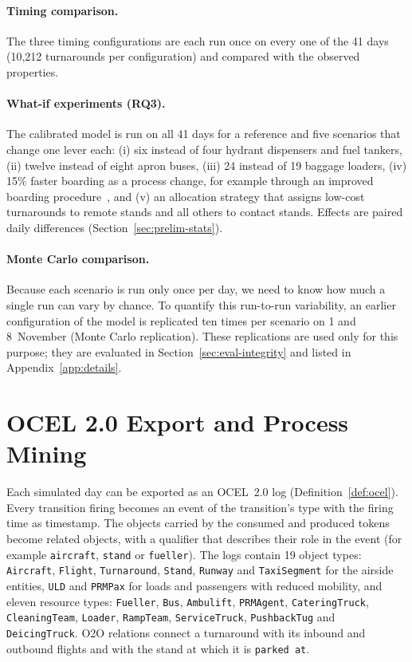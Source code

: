 \paragraph{Timing comparison.}
The three timing configurations are each run once on every one of the 41 days (10,212 turnarounds per configuration) and compared with the observed properties.

\paragraph{What-if experiments (RQ3).}
The calibrated model is run on all 41 days for a reference and five scenarios that change one lever each: (i) six instead of four hydrant dispensers and fuel tankers, (ii) twelve instead of eight apron buses, (iii) 24 instead of 19 baggage loaders, (iv) 15\% faster boarding as a process change, for example through an improved boarding procedure~\cite{schultz2018boarding}, and (v) an allocation strategy that assigns low-cost turnarounds to remote stands and all others to contact stands. Effects are paired daily differences (Section~\ref{sec:prelim-stats}).

\paragraph{Monte Carlo comparison.}
Because each scenario is run only once per day, we need to know how much a single run can vary by chance. To quantify this run-to-run variability, an earlier configuration of the model is replicated ten times per scenario on 1 and 8~November (Monte Carlo replication). These replications are used only for this purpose; they are evaluated in Section~\ref{sec:eval-integrity} and listed in Appendix~\ref{app:details}.

\section{OCEL 2.0 Export and Process Mining}
\label{sec:method-ocel}

Each simulated day can be exported as an OCEL~2.0 log (Definition~\ref{def:ocel}). Every transition firing becomes an event of the transition's type with the firing time as timestamp. The objects carried by the consumed and produced tokens become related objects, with a qualifier that describes their role in the event (for example \texttt{aircraft}, \texttt{stand} or \texttt{fueller}). The logs contain 19 object types: \texttt{Aircraft}, \texttt{Flight}, \texttt{Turnaround}, \texttt{Stand}, \texttt{Runway} and \texttt{TaxiSegment} for the airside entities, \texttt{ULD} and \texttt{PRMPax} for loads and passengers with reduced mobility, and eleven resource types: \texttt{Fueller}, \texttt{Bus}, \texttt{Ambulift}, \texttt{PRMAgent}, \texttt{CateringTruck}, \texttt{CleaningTeam}, \texttt{Loader}, \texttt{RampTeam}, \texttt{ServiceTruck}, \texttt{PushbackTug} and \texttt{DeicingTruck}. O2O relations connect a turnaround with its inbound and outbound flights and with the stand at which it is \texttt{parked at}.

